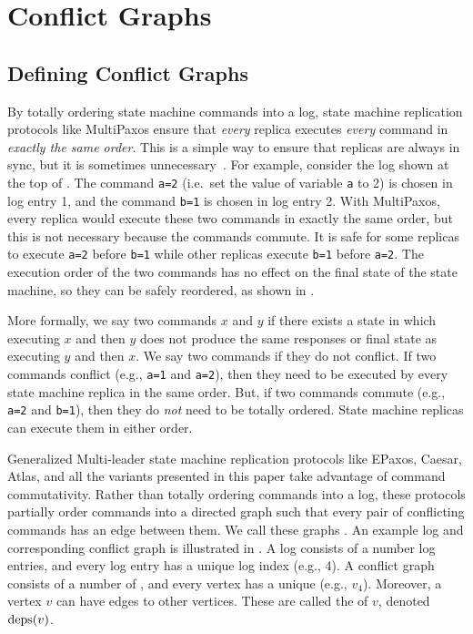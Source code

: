 \section{Conflict Graphs}
\subsection{Defining Conflict Graphs}
By totally ordering state machine commands into a log, state machine
replication protocols like MultiPaxos ensure that \emph{every} replica executes
\emph{every} command in \emph{exactly the same order}. This is a simple way to
ensure that replicas are always in sync, but it is sometimes
unnecessary~\cite{lamport2005generalized}. For example, consider the log shown
at the top of . The command \texttt{a=2} (i.e.\ set the
value of variable \texttt{a} to 2) is chosen in log entry 1, and the command
\texttt{b=1} is chosen in log entry 2. With MultiPaxos, every replica would
execute these two commands in exactly the same order, but this is not necessary
because the commands commute. It is safe for some replicas to execute
\texttt{a=2} before \texttt{b=1} while other replicas execute \texttt{b=1}
before \texttt{a=2}. The execution order of the two commands has no effect on
the final state of the state machine, so they can be safely reordered, as shown
in .

{}

More formally, we say two commands $x$ and $y$  if there
exists a state in which executing $x$ and then $y$ does not produce the same
responses or final state as executing $y$ and then $x$. We say two commands
 if they do not conflict. If two commands conflict (e.g.,
\texttt{a=1} and \texttt{a=2}), then they need to be executed by every state
machine replica in the same order. But, if two commands commute (e.g.,
\texttt{a=2} and \texttt{b=1}), then they do \emph{not} need to be totally
ordered. State machine replicas can execute them in either order.

Generalized Multi-leader state machine replication protocols like EPaxos,
Caesar, Atlas, and all the \BPaxos{} variants presented in this paper take
advantage of command commutativity. Rather than totally ordering commands into
a log, these protocols partially order commands into a directed graph such that
every pair of conflicting commands has an edge between them. We call these
graphs . An example log and corresponding conflict
graph is illustrated in . A log consists of a number log
entries, and every log entry has a unique log index (e.g., 4). A conflict graph
consists of a number of , and every vertex has a unique
 (e.g., $v_4$). Moreover, a vertex $v$ can have edges to
other vertices. These are called the  of $v$, denoted
$\text{deps}(v)$.

